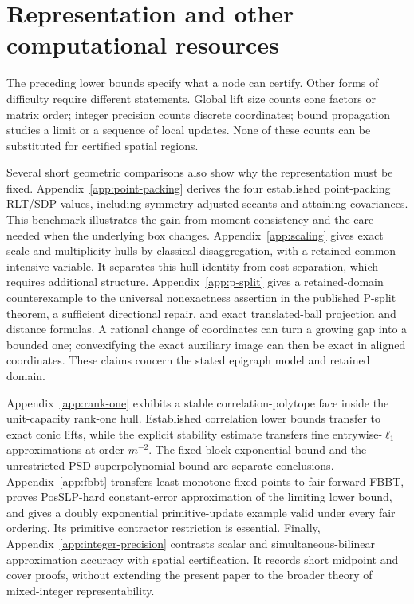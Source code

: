 \section{Representation and other computational resources}\label{sec:comparisons}
The preceding lower bounds specify what a node can certify. Other forms
of difficulty require different statements. Global lift size counts cone
factors or matrix order; integer precision counts discrete coordinates;
bound propagation studies a limit or a sequence of local updates. None
of these counts can be substituted for certified spatial regions.

Several short geometric comparisons also show why the representation must
be fixed. Appendix~\ref{app:point-packing} derives the four established
point-packing RLT/SDP values, including symmetry-adjusted secants and
attaining covariances. This benchmark illustrates the gain from moment
consistency and the care needed when the underlying box changes.
Appendix~\ref{app:scaling} gives exact scale and multiplicity hulls by
classical disaggregation, with a retained common intensive variable.
It separates this hull identity from cost separation, which requires
additional structure. Appendix~\ref{app:p-split} gives a retained-domain
counterexample to the universal nonexactness assertion in the published
P-split theorem, a sufficient directional repair, and exact translated-ball
projection and distance formulas. A rational change of coordinates can
turn a growing gap into a bounded one; convexifying the exact auxiliary
image can then be exact in aligned coordinates. These claims concern the
stated epigraph model and retained domain.

Appendix~\ref{app:rank-one} exhibits a stable correlation-polytope face
inside the unit-capacity rank-one hull. Established correlation lower
bounds transfer to exact conic lifts, while the explicit stability estimate
transfers fine entrywise-$\ell_1$ approximations at order $m^{-2}$.
The fixed-block exponential bound and the unrestricted PSD
superpolynomial bound are separate conclusions. Appendix~\ref{app:fbbt}
transfers least monotone fixed points to fair forward FBBT, proves
PosSLP-hard constant-error approximation of the limiting lower bound,
and gives a doubly exponential primitive-update example valid under every
fair ordering. Its primitive contractor restriction is essential.
Finally, Appendix~\ref{app:integer-precision} contrasts scalar and
simultaneous-bilinear approximation accuracy with spatial certification.
It records short midpoint and cover proofs, without extending the present
paper to the broader theory of mixed-integer representability.
